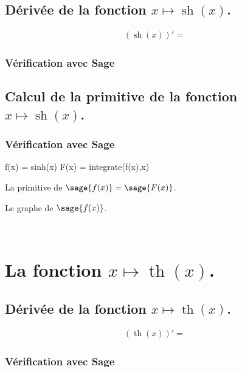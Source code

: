 \documentclass[a4paper,14pt]{extreport} %
\renewcommand{\sinh}{\mathop{\mathrm{sh}}}
\renewcommand{\tanh}{\mathop{\mathrm{th}}}
\begin{document}
\subsection{Dérivée de la fonction $x \mapsto \sinh(x)$.}

\begin{align*}
(\sinh(x))' = &
\end{align*}


\subsubsection{Vérification avec Sage}


\subsection{Calcul de la primitive de la fonction  $x \mapsto \sinh(x)$.}


\subsubsection{Vérification avec Sage}

\begin{sageblock}
    f(x) = sinh(x)
    F(x) = integrate(f(x),x)
\end{sageblock}


La primitive de $\sage{f(x)} = \sage{F(x)} $.

Le graphe de $\sage{f(x)} $.


\begin{center}
 \\
\end{center}




\section{La fonction  $x \mapsto \tanh(x)$.}

\subsection{Dérivée de la fonction $x \mapsto \tanh(x)$.}

\begin{align*}
(\tanh(x))' = &
\end{align*}


\subsubsection{Vérification avec Sage}
\end{document}
